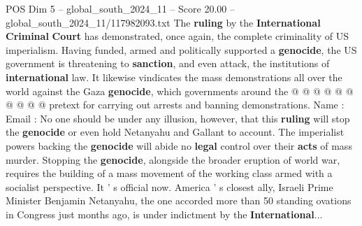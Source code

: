 \begin{textsample}{POS Dim 5 – global\_south\_2024\_11 – Score 20.00 – global\_south\_2024\_11/117982093.txt}
The \textbf{ruling} by the \textbf{International} \textbf{Criminal} \textbf{Court} has demonstrated, once again, the complete criminality of US imperialism.
Having funded, armed and politically supported a \textbf{genocide}, the US government is threatening to \textbf{sanction}, and even attack, the institutions of \textbf{international} law.
It likewise vindicates the mass demonstrations all over the world against the Gaza \textbf{genocide}, which governments around the @ @ @ @ @ @ @ @ @ @ pretext for carrying out arrests and banning demonstrations.
Name : Email : No one should be under any illusion, however, that this \textbf{ruling} will stop the \textbf{genocide} or even hold Netanyahu and Gallant to account.
The imperialist powers backing the \textbf{genocide} will abide no \textbf{legal} control over their \textbf{acts} of mass murder.
Stopping the \textbf{genocide}, alongside the broader eruption of world war, requires the building of a mass movement of the working class armed with a socialist perspective.
It ' s official now.
America ' s closest ally, Israeli Prime Minister Benjamin Netanyahu, the one accorded more than 50 standing ovations in Congress just months ago, is under indictment by the \textbf{International}...

\end{textsample}
